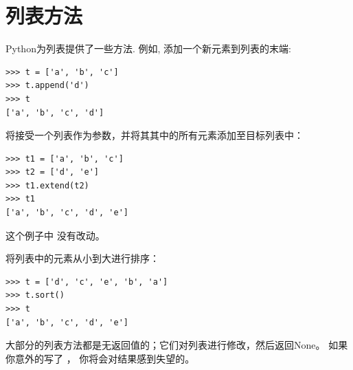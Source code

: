 \section{列表方法}


Python为列表提供了一些方法. 例如,  添加一个新元素到列表的末端:

  

\begin{lstlisting}
>>> t = ['a', 'b', 'c']
>>> t.append('d')
>>> t
['a', 'b', 'c', 'd']
\end{lstlisting}
%

 将接受一个列表作为参数，并将其其中的所有元素添加至目标列表中：
  

\begin{lstlisting}
>>> t1 = ['a', 'b', 'c']
>>> t2 = ['d', 'e']
>>> t1.extend(t2)
>>> t1
['a', 'b', 'c', 'd', 'e']
\end{lstlisting}

%

这个例子中  没有改动。


 将列表中的元素从小到大进行排序：
  

\begin{lstlisting}
>>> t = ['d', 'c', 'e', 'b', 'a']
>>> t.sort()
>>> t
['a', 'b', 'c', 'd', 'e']
\end{lstlisting}

%

大部分的列表方法都是无返回值的；它们对列表进行修改，然后返回None。
如果你意外的写了 ， 你将会对结果感到失望的。
  
  


